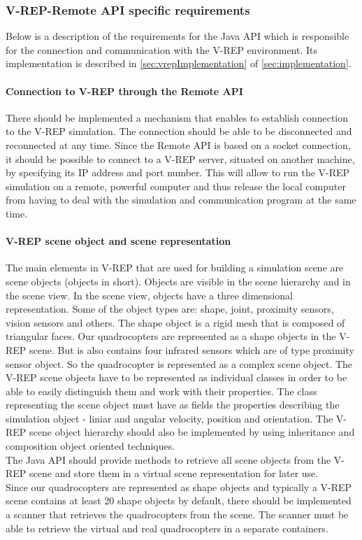 \subsubsection{V-REP-Remote API specific requirements}
\label{sec:requirementsVREP}

Below is a description of the requirements for the Java API which is responsible for the connection and communication with the V-REP environment. Its implementation is described in \ref{sec:vrepImplementation} of \ref{sec:implementation}.

\paragraph{Connection to V-REP through the Remote API}

There should be implemented a mechanism that enables to establish connection to the V-REP simulation. The connection should be able to be disconnected and reconnected at any time. Since the Remote API is based on a socket connection, it should be possible to connect to a V-REP server, situated on another machine, by specifying its IP address and port number. This will allow to run the V-REP simulation on a remote, powerful computer and thus release the local computer from having to deal with the simulation and communication program at the same time.

\paragraph{V-REP scene object and scene representation}\label{sceneobject}
The main elements in V-REP that are used for building a simulation scene are scene objects (objects in short). Objects are visible in the scene hierarchy and in the scene view. In the scene view, objects have a three dimensional representation. Some of the object types are: shape, joint, proximity sensors, vision sensors and others. The shape object is a rigid mesh that is composed of triangular faces. Our quadrocopters are represented as a shape objects in the V-REP scene. But is also contains four infrared sensors which are of type proximity sensor object. So the quadrocopter is represented as a complex scene object. 
The V-REP scene objects have to be represented as individual classes in order to be able to easily distinguish them and work with their properties. The class representing the scene object must have as fields the properties describing the simulation object - liniar and angular velocity, position and orientation. The V-REP scene object hierarchy should also be implemented by using inheritance and composition object oriented techniques. \\
The Java API should provide methods to retrieve all scene objects from the V-REP scene and store them in a virtual scene representation for later use.\\
Since our quadrocopters are represented as shape objects and typically a V-REP scene contains at least 20 shape objects by default, there should be implemented a scanner that retrieves the quadrocopters from the scene. The scanner must be able to retrieve the virtual and real quadrocopters in a separate containers.

